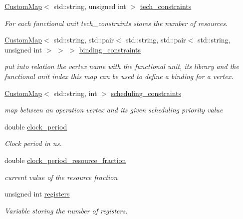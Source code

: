 \begin{DoxyCompactItemize}
\item 
\hyperlink{custom__map_8hpp_a18ca01763abbe3e5623223bfe5aaac6b}{Custom\+Map}$<$ std\+::string, unsigned int $>$ \hyperlink{classHLS__constraints_a9c622d8a77390c41a8abf51d989ca7ee}{tech\+\_\+constraints}
\begin{DoxyCompactList}\small\item\em For each functional unit tech\+\_\+constraints stores the number of resources. \end{DoxyCompactList}\item 
\hyperlink{custom__map_8hpp_a18ca01763abbe3e5623223bfe5aaac6b}{Custom\+Map}$<$ std\+::string, std\+::pair$<$ std\+::string, std\+::pair$<$ std\+::string, unsigned int $>$ $>$ $>$ \hyperlink{classHLS__constraints_aa0ec5bd7ca34862b3786089e8360b63e}{binding\+\_\+constraints}
\begin{DoxyCompactList}\small\item\em put into relation the vertex name with the functional unit, its library and the functional unit index this map can be used to define a binding for a vertex. \end{DoxyCompactList}\item 
\hyperlink{custom__map_8hpp_a18ca01763abbe3e5623223bfe5aaac6b}{Custom\+Map}$<$ std\+::string, int $>$ \hyperlink{classHLS__constraints_a8cbded9579c7865e1e2eba41cf763271}{scheduling\+\_\+constraints}
\begin{DoxyCompactList}\small\item\em map between an operation vertex and its given scheduling priority value \end{DoxyCompactList}\item 
double \hyperlink{classHLS__constraints_a8645bf9e5ae984eefe022a4ab1d65aa7}{clock\+\_\+period}
\begin{DoxyCompactList}\small\item\em Clock period in ns. \end{DoxyCompactList}\item 
double \hyperlink{classHLS__constraints_a9b9d4a8f5e65a7164c52edfe92c52af7}{clock\+\_\+period\+\_\+resource\+\_\+fraction}
\begin{DoxyCompactList}\small\item\em current value of the resource fraction \end{DoxyCompactList}\item 
unsigned int \hyperlink{classHLS__constraints_ae36d9fde4e292cd2a651501706ec2325}{registers}
\begin{DoxyCompactList}\small\item\em Variable storing the number of registers. \end{DoxyCompactList}\item 

\end{DoxyCompactItemize}
